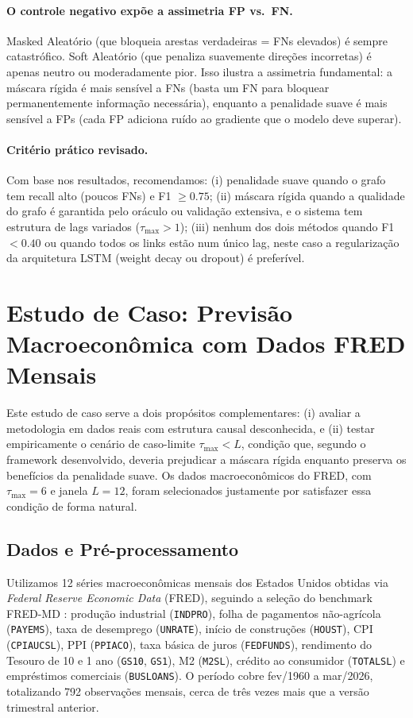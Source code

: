 \documentclass[12pt, a4paper]{article}
\begin{document}
\paragraph{O controle negativo expõe a assimetria FP vs.\ FN.}
Masked Aleatório (que bloqueia arestas verdadeiras = FNs elevados) é sempre catastrófico. Soft Aleatório (que penaliza suavemente direções incorretas) é apenas neutro ou moderadamente pior. Isso ilustra a assimetria fundamental: a máscara rígida é mais sensível a FNs (basta um FN para bloquear permanentemente informação necessária), enquanto a penalidade suave é mais sensível a FPs (cada FP adiciona ruído ao gradiente que o modelo deve superar).

\paragraph{Critério prático revisado.}
Com base nos resultados, recomendamos: (i) penalidade suave quando o grafo tem recall alto (poucos FNs) e F1 $\geq 0.75$; (ii) máscara rígida quando a qualidade do grafo é garantida pelo oráculo ou validação extensiva, e o sistema tem estrutura de lags variados ($\tau_{\max} > 1$); (iii) nenhum dos dois métodos quando F1 $< 0.40$ ou quando todos os links estão num único lag, neste caso a regularização da arquitetura LSTM (weight decay ou dropout) é preferível.








\section{Estudo de Caso: Previsão Macroeconômica com Dados FRED Mensais}

Este estudo de caso serve a dois propósitos complementares: (i) avaliar a metodologia em dados reais com estrutura causal desconhecida, e (ii) testar empiricamente o cenário de caso-limite $\tau_{\max} < L$, condição que, segundo o framework desenvolvido, deveria prejudicar a máscara rígida enquanto preserva os benefícios da penalidade suave. Os dados macroeconômicos do FRED, com $\tau_{\max} = 6$ e janela $L = 12$, foram selecionados justamente por satisfazer essa condição de forma natural.

\subsection{Dados e Pré-processamento}

Utilizamos 12 séries macroeconômicas mensais dos Estados Unidos obtidas via \textit{Federal Reserve Economic Data} (FRED), seguindo a seleção do benchmark FRED-MD \cite{mccracken2016}: produção industrial (\texttt{INDPRO}), folha de pagamentos não-agrícola (\texttt{PAYEMS}), taxa de desemprego (\texttt{UNRATE}), início de construções (\texttt{HOUST}), CPI (\texttt{CPIAUCSL}), PPI (\texttt{PPIACO}), taxa básica de juros (\texttt{FEDFUNDS}), rendimento do Tesouro de 10 e 1 ano (\texttt{GS10}, \texttt{GS1}), M2 (\texttt{M2SL}), crédito ao consumidor (\texttt{TOTALSL}) e empréstimos comerciais (\texttt{BUSLOANS}). O período cobre fev/1960 a mar/2026, totalizando 792 observações mensais, cerca de três vezes mais que a versão trimestral anterior.
\end{document}
